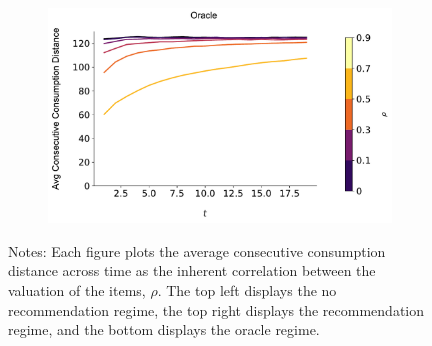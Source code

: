 \documentclass[format=acmsmall, review=true]{acmart}
\begin{document}
\begin{figure}[H]
\begin{subfigure}{.45\textwidth}
\end{subfigure}\\
\begin{subfigure}{.45\textwidth}
\includegraphics[width=\linewidth]{figures/rho_consumption_dist_N_500T_20_omni.pdf}\\
\end{subfigure}
\caption*{\scriptsize Notes: Each figure plots the average consecutive consumption distance across time as the inherent correlation between the valuation of the items, $\rho$. The top left displays the no recommendation regime, the top right displays the recommendation regime, and the bottom displays the oracle regime.}
\label{fig:local_consumption_across_rho}
\end{figure}

\addtocounter{figure}{-1}
\end{document}
